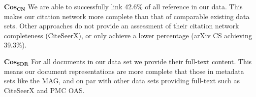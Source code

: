 $\mathbf{Cos_{CN}}$ We are able to successfully link 42.6\% of all reference in our data. This makes our citation network more complete than that of comparable existing data sets. Other approaches do not provide an assessment of their citation network completeness (CiteSeerX), or only achieve a lower percentage (arXiv CS achieving 39.3\%).

$\mathbf{Cos_{SDR}}$ For all documents in our data set we provide their full-text content. This means our document representations are more complete that those in metadata sets like the MAG, and on par with other data sets providing full-text such as CiteSeerX and PMC OAS. \\








% 


%
%
